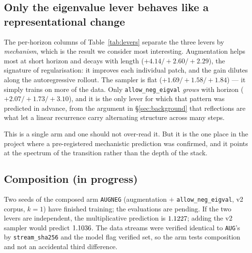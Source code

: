 \subsection{Only the eigenvalue lever behaves like a representational change}

The per-horizon columns of Table~\ref{tab:levers} separate the three levers by
\emph{mechanism}, which is the result we consider most interesting.
Augmentation helps most at short horizon and decays with length
($+4.14 / +2.60 / +2.29$), the signature of regularisation: it improves each
individual patch, and the gain dilutes along the autoregressive rollout. The
sampler is flat ($+1.69 / +1.58 / +1.84$) --- it simply trains on more of the
data. Only \texttt{allow\_neg\_eigval} \emph{grows} with horizon
($+2.07 / +1.73 / +3.10$), and it is the only lever for which that pattern was
predicted in advance, from the argument in \S\ref{sec:background} that
reflections are what let a linear recurrence carry alternating structure across
many steps.

This is a single arm and one should not over-read it. But it is the one place
in the project where a pre-registered mechanistic prediction was confirmed, and
it points at the spectrum of the transition rather than the depth of the stack.

\subsection{Composition (in progress)}

Two seeds of the composed arm \texttt{AUGNEG} (augmentation $+$
\texttt{allow\_neg\_eigval}, v2 corpus, $k=1$) have finished training; the
evaluations are pending. If the two levers are independent, the multiplicative
prediction is $1.1227$; adding the v2 sampler would predict
$1.1036$. The data streams were verified identical to
\texttt{AUG}'s by \texttt{stream\_sha256} and the model flag verified set, so
the arm tests composition and not an accidental third difference.


